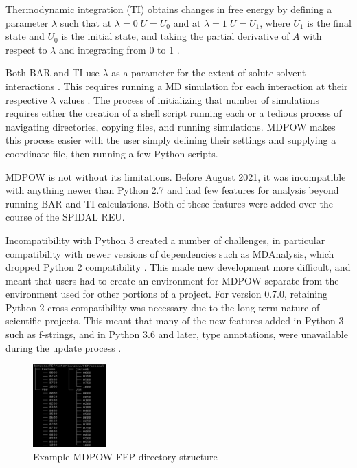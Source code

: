 \documentclass{article}[letterpaper, margins=1in, 12pt]
\begin{document}
Thermodynamic integration (TI) obtains changes in free energy by defining a parameter $\lambda$ such that at $\lambda = 0 \; U = U_0$ and at $\lambda = 1 \; U = U_1$, where $U_1$ is the final state and $U_0$ is the initial state, and taking the partial derivative of $A$ with respect to $\lambda$ and integrating from 0 to 1 \cite{chipot_free_2007}.

Both BAR and TI use $\lambda$ as a parameter for the extent of solute-solvent interactions \cite{chipot_free_2007}. This requires running a MD simulation for  each interaction at their respective $\lambda$ values \cite{lemkul_proteins_2019}. The process of initializing that number of simulations requires either the creation of a shell script running each or a tedious process of navigating directories, copying files, and running simulations. MDPOW makes this process easier with the user simply defining their settings and supplying a coordinate file, then running a few Python scripts.

MDPOW is not without its limitations. Before August 2021, it was incompatible with anything newer than Python 2.7 and had few features for analysis beyond running BAR and TI calculations. Both of these features were added over the course of the SPIDAL REU.

Incompatibility with Python 3 created a number of challenges, in particular compatibility with newer versions of dependencies such as MDAnalysis, which dropped Python 2 compatibility \cite{michaud-agrawal_mdanalysis_2011, gowers_mdanalysis_2016}. This made new development more difficult, and meant that users had to create an environment for MDPOW separate from the environment used for other portions of a project. For version 0.7.0, retaining Python 2 cross-compatibility was  necessary due to the long-term nature of scientific projects. This meant that many of the new features added in Python 3 such as f-strings, and in Python 3.6 and later, type annotations, were unavailable during the update process \cite{fan_precise_2021, Beckstein_Iorga_2012}.

\begin{figure}
	\centering
	\includegraphics[width=0.25\textwidth]{directory}
	\caption{Example MDPOW FEP directory structure}
	\label{fig:directory}
\end{figure}
\end{document}
